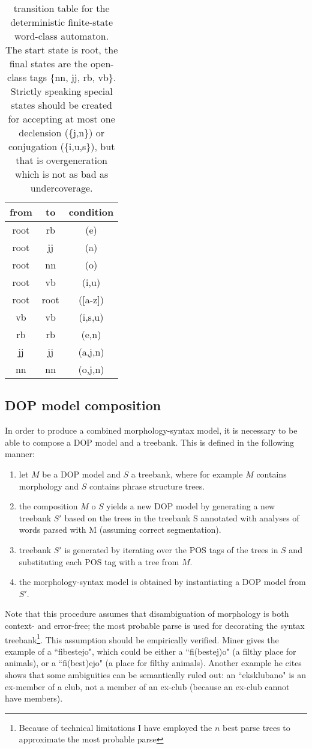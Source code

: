 \documentclass[10pt,a4paper]{article}
\begin{document}
\begin{table}
\begin{tabular}{ccc}
from & to & condition \\ \hline
root & rb & (e) \\
root & jj & (a) \\
root & nn & (o) \\
root & vb & ({i,u}) \\
root & root & ([a-z]) \\
vb & vb & ({i,s,u}) \\
rb & rb & ({e,n})  \\
jj & jj & ({a,j,n}) \\
nn & nn & ({o,j,n})
\end{tabular}
\caption{transition table for the deterministic finite-state word-class
automaton. The start state is root, the final states are the open-class tags
\{nn, jj, rb, vb\}. Strictly speaking special states should be created for
accepting at most one declension (\{j,n\}) or conjugation (\{i,u,s\}), but that
is overgeneration which is not as bad as undercoverage.}
\label{posfsa-tab}
\end{table}


\subsection{DOP model composition}

In order to produce a combined morphology-syntax model, it is necessary to be
able to compose a DOP model and a treebank. This is defined in the following
manner:

\begin{enumerate}
\item let $M$ be a DOP model and $S$ a treebank, where for example $M$ contains
      morphology and $S$ contains phrase structure trees.
\item the composition $M$ o $S$ yields a new DOP model by generating a new
      treebank $S'$ based on the trees in the treebank S annotated with
      analyses of words parsed with M (assuming correct segmentation).
\item treebank $S'$ is generated by iterating over the POS tags of the trees in
      $S$ and substituting each POS tag with a tree from $M$.
\item the morphology-syntax model is obtained by instantiating a DOP model from
      $S'$.
\end{enumerate}

Note that this procedure assumes that disambiguation of morphology is both
context- and error-free; the most probable parse is used for decorating the
syntax treebank\footnote{Because of technical limitations I have employed the
$n$ best parse trees to approximate the most probable parse}. This assumption
should be empirically verified. Miner gives the example of a ``fibestejo", which
could be either a ``fi(bestej)o" (a filthy place for animals), or a ``fi(best)ejo"
(a place for filthy animals).  Another example he cites shows that some
ambiguities can be semantically ruled out: an ``eksklubano" is an ex-member of
a club, not a member of an ex-club (because an ex-club cannot have members).
\end{document}
